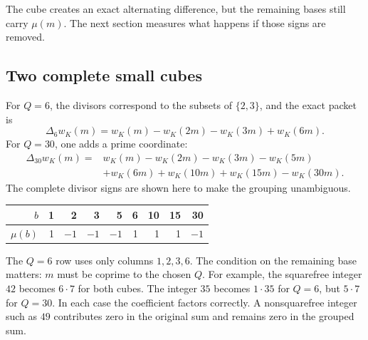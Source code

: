 The cube creates an exact alternating difference, but the remaining bases still carry \(\mu(m)\). The next section measures what happens if those signs are removed.

\subsection{Two complete small cubes}

For \(Q=6\), the divisors correspond to the subsets of \(\{2,3\}\), and the exact packet is
\[
\Delta_6w_K(m)=w_K(m)-w_K(2m)-w_K(3m)+w_K(6m).
\]
For \(Q=30\), one adds a prime coordinate:
\begin{align*}
\Delta_{30}w_K(m)={}&w_K(m)-w_K(2m)-w_K(3m)-w_K(5m)\\
&+w_K(6m)+w_K(10m)+w_K(15m)-w_K(30m).
\end{align*}
The complete divisor signs are shown here to make the grouping unambiguous.
\begin{center}
\begin{tabular}{rrrrrrrrr}
\toprule
\(b\)&1&2&3&5&6&10&15&30\\
\midrule
\(\mu(b)\)&1&\(-1\)&\(-1\)&\(-1\)&1&1&1&\(-1\)\\
\bottomrule
\end{tabular}
\end{center}
The \(Q=6\) row uses only columns \(1,2,3,6\). The condition on the remaining base matters: \(m\) must be coprime to the chosen \(Q\). For example, the squarefree integer \(42\) becomes \(6\cdot7\) for both cubes. The integer \(35\) becomes \(1\cdot35\) for \(Q=6\), but \(5\cdot7\) for \(Q=30\). In each case the coefficient factors correctly. A nonsquarefree integer such as \(49\) contributes zero in the original sum and remains zero in the grouped sum.

